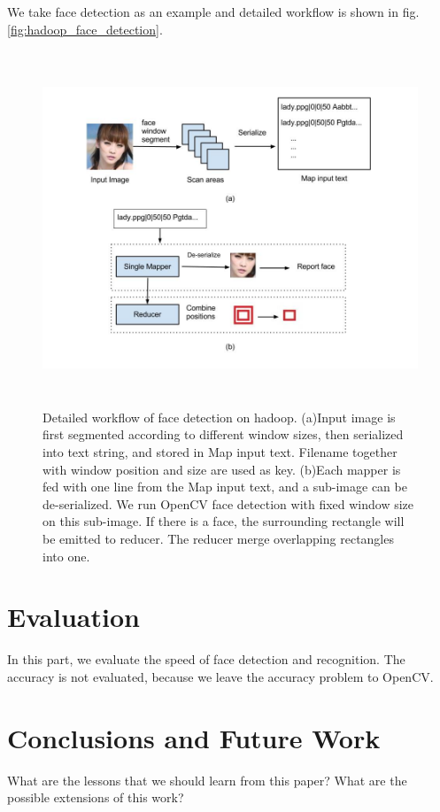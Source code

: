 \documentclass[11pt, draftclsnofoot, onecolumn]{IEEEtran}
\begin{document}
We take face detection as an example and detailed workflow is shown in fig.\ref{fig:hadoop_face_detection}.

\begin{figure}
\centering
\includegraphics[height=300pt]{hadoop_face_detection}
\caption{Detailed workflow of face detection on hadoop. (a)Input image is first segmented according to different window sizes, then serialized into text string, and stored in Map input text. Filename together with window position and size are used as key. (b)Each mapper is fed with one line from the Map input text, and a sub-image can be de-serialized. We run OpenCV face detection with fixed window size on this sub-image. If there is a face, the surrounding rectangle will be emitted to reducer. The reducer merge overlapping rectangles into one.}
\end{figure}

\section{Evaluation} \label{sec:evaluation}

In this part, we evaluate the speed of face detection and recognition. The accuracy is not evaluated, because we leave the accuracy problem to OpenCV.

\section{Conclusions and Future Work} \label{sec:conclusion}

What are the lessons that we should learn from this paper?
What are the possible extensions of this work?



\end{document}
